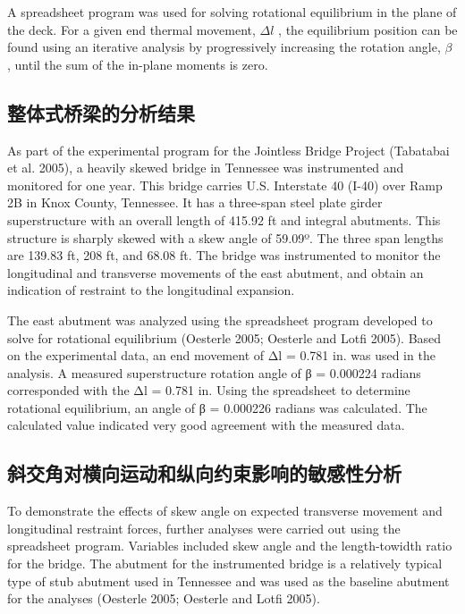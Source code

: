 A spreadsheet program was used for solving rotational equilibrium in the plane of the deck. For a given end thermal movement, $\Delta l$ , the equilibrium position can be found using an iterative analysis by progressively increasing the rotation angle, $\beta$ , until the sum of the in-plane moments is zero.

\subsection{整体式桥梁的分析结果}
As part of the experimental program for the Jointless Bridge Project (Tabatabai et al. 2005), a heavily skewed bridge in Tennessee was instrumented and monitored for one year. This bridge carries U.S. Interstate 40 (I-40) over Ramp 2B in Knox County, Tennessee. It has a three-span steel plate girder superstructure with an overall length of 415.92 ft and integral abutments. This structure is sharply skewed with a skew angle of 59.09º. The three span lengths are 139.83 ft, 208 ft, and 68.08 ft. The bridge was instrumented to monitor the longitudinal and transverse movements of the east abutment, and obtain an indication of restraint to the longitudinal expansion.

The east abutment was analyzed using the spreadsheet program developed to solve for rotational equilibrium (Oesterle 2005; Oesterle and Lotfi 2005). Based on the experimental data, an end movement of Δl = 0.781 in. was used in the analysis. A measured superstructure rotation angle of β = 0.000224 radians corresponded with the Δl = 0.781 in. Using the spreadsheet to determine rotational equilibrium, an angle of β = 0.000226 radians was calculated. The calculated value indicated very good agreement with the measured data.

\subsection{斜交角对横向运动和纵向约束影响的敏感性分析}
To demonstrate the effects of skew angle on expected transverse movement and longitudinal restraint forces,
further analyses were carried out using the spreadsheet program. Variables included skew angle and the length-towidth
ratio for the bridge. The abutment for the instrumented bridge is a relatively typical type of stub abutment used
in Tennessee and was used as the baseline abutment for the analyses (Oesterle 2005; Oesterle and Lotfi 2005).

